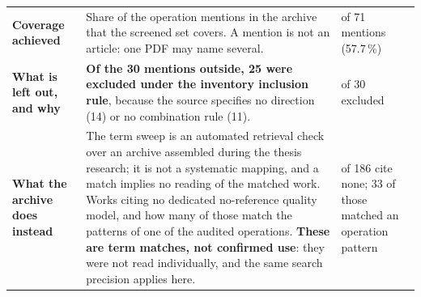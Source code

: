 \begin{table}[!ht]
\begin{tabular}{@{}>{\raggedright\arraybackslash}p{2.2cm}>{\raggedright\arraybackslash}p{6.6cm}>{\raggedright\arraybackslash}p{2.9cm}@{}}
\textbf{Coverage achieved} & Share of the operation mentions in the archive that the screened set covers. A mention is not an article: one PDF may name several. & 41 of 71 mentions (57.7\,\%) \\
\rowcolor{rowlight}\textbf{What is left out, and why} & \textbf{Of the 30 mentions outside, 25 were excluded under the inventory inclusion rule}, because the source specifies no direction (14) or no combination rule (11). & 25 of 30 excluded \\
\textbf{What the archive does instead} & The term sweep is an automated retrieval check over an archive assembled during the thesis research; it is not a systematic mapping, and a match implies no reading of the matched work. Works citing no dedicated no-reference quality model, and how many of those match the patterns of one of the audited operations. \textbf{These are term matches, not confirmed use}: they were not read individually, and the same search precision applies here. & 173 of 186 cite none; 33 of those matched an operation pattern \\
\bottomrule
\end{tabular}
\end{table}
